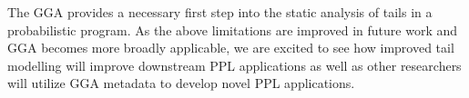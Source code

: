 \documentclass[thesis.tex]{subfiles}
\begin{document}
The GGA provides a necessary first step into the static analysis of tails in
a probabilistic program.
As the above limitations are improved in future work and GGA becomes more broadly applicable,
we are excited to see how improved tail modelling will improve downstream PPL applications
as well as
other researchers will utilize GGA metadata to develop
novel PPL applications.






% 
% 
\end{document}

